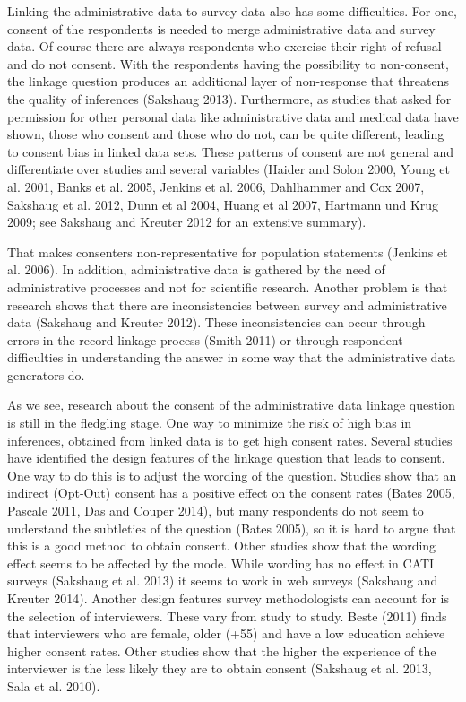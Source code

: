 Linking the administrative data to survey data also has some difficulties. For one, consent of the respondents is needed to merge administrative data and survey data. Of course there are always respondents who exercise their right of refusal and do not consent. With the respondents having the possibility to non-consent, the linkage question produces an additional layer of non-response that threatens the quality of inferences (Sakshaug 2013). Furthermore, as studies that asked for permission for other personal data like administrative data and medical data have shown, those who consent and those who do not, can be quite different, leading to consent bias in linked data sets. These patterns of consent are not general and differentiate over studies and several variables (Haider and Solon 2000, Young et al. 2001, Banks et al. 2005, Jenkins et al. 2006, Dahlhammer and Cox 2007, Sakshaug et al. 2012, Dunn et al 2004, Huang et al 2007, Hartmann und Krug 2009; see Sakshaug and Kreuter 2012 for an extensive summary). 
 
That makes consenters non-representative for population statements (Jenkins et al. 2006). In addition, administrative data is gathered by the need of administrative processes and not for scientific research. Another problem is that research shows that there are inconsistencies between survey and administrative data (Sakshaug and Kreuter 2012). These inconsistencies can occur through errors in the record linkage process (Smith 2011) or through respondent difficulties in understanding the answer in some way that the administrative data generators do. 

As we see, research about the consent of the administrative data linkage question is still in the fledgling stage. One way to minimize the risk of high bias in inferences, obtained from linked data is to get high consent rates. Several studies have identified the design features of the linkage question that leads to consent. One way to do this is to adjust the wording of the question. Studies show that an indirect (Opt-Out) consent has a positive effect on the consent rates (Bates 2005, Pascale 2011, Das and Couper 2014), but many respondents do not seem to understand the subtleties of the question (Bates 2005), so it is hard to argue that this is a good method to obtain consent. Other studies show that the wording effect seems to be affected by the mode. While wording has no effect in CATI surveys (Sakshaug et al. 2013) it seems to work in web surveys (Sakshaug and Kreuter 2014). Another design features survey methodologists can account for is the selection of interviewers. These vary from study to study. Beste (2011) finds that interviewers who are female, older (+55) and have a low education achieve higher consent rates.  Other studies show that the higher the experience of the interviewer is the less likely they are to obtain consent (Sakshaug et al. 2013, Sala et al. 2010).

